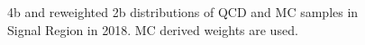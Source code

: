 \begin{figure}[ht]
 

    \caption{4b and reweighted 2b distributions of QCD and \ttbar MC samples in Signal Region in 2018.
             MC derived weights are used.}
    \label{fig:mc-weights-4b-SR-2018}
\end{figure}


